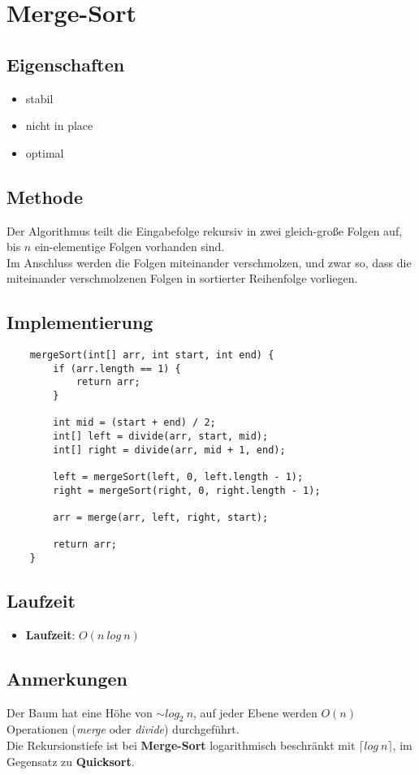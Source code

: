 \section{Merge-Sort}


\subsection{Eigenschaften}
\begin{itemize}
    \item stabil
    \item nicht in place
    \item optimal
\end{itemize}

\subsection{Methode}
Der Algorithmus teilt die Eingabefolge rekursiv in zwei gleich-große Folgen auf, bis $n$ ein-elementige Folgen vorhanden sind.\\
Im Anschluss werden die Folgen miteinander verschmolzen, und zwar so, dass die miteinander verschmolzenen Folgen in sortierter Reihenfolge vorliegen.\\


\subsection{Implementierung}
\begin{verbatim}
    mergeSort(int[] arr, int start, int end) {
        if (arr.length == 1) {
            return arr;
        }

        int mid = (start + end) / 2;
        int[] left = divide(arr, start, mid);
        int[] right = divide(arr, mid + 1, end);

        left = mergeSort(left, 0, left.length - 1);
        right = mergeSort(right, 0, right.length - 1);

        arr = merge(arr, left, right, start);

        return arr;
    }
\end{verbatim}


\subsection{Laufzeit}
\begin{itemize}
    \item \textbf{Laufzeit}: $O(n\ log\ n)$
\end{itemize}

\subsection{Anmerkungen}
Der Baum hat eine Höhe von $\sim log_2\ n$, auf jeder Ebene werden $O(n)$ Operationen (\textit{merge} oder \textit{divide}) durchgeführt.\\
Die Rekursionstiefe ist bei \textbf{Merge-Sort} logarithmisch beschränkt mit $\lceil log\ n \rceil$, im Gegensatz zu \textbf{Quicksort}.